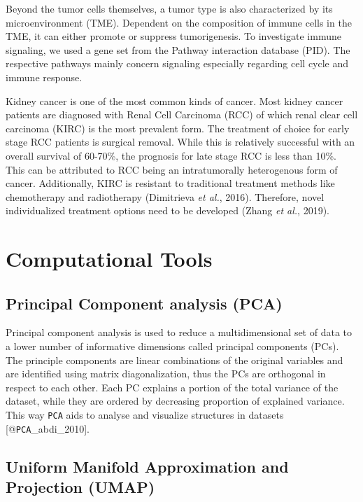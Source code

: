\documentclass[
  parskip,
  oneside]{scrreprt}
\begin{document}
Beyond the tumor cells themselves, a tumor type is also characterized by
its microenvironment (TME). Dependent on the composition of immune cells
in the TME, it can either promote or suppress tumorigenesis. To
investigate immune signaling, we used a gene set from the Pathway
interaction database (PID). The respective pathways mainly concern
signaling especially regarding cell cycle and immune response.

Kidney cancer is one of the most common kinds of cancer. Most kidney
cancer patients are diagnosed with Renal Cell Carcinoma (RCC) of which
renal clear cell carcinoma (KIRC) is the most prevalent form. The
treatment of choice for early stage RCC patients is surgical removal.
While this is relatively successful with an overall survival of 60-70\%,
the prognosis for late stage RCC is less than 10\%. This can be
attributed to RCC being an intratumorally heterogenous form of cancer.
Additionally, KIRC is resistant to traditional treatment methods like
chemotherapy and radiotherapy (Dimitrieva \emph{et al.}, 2016).
Therefore, novel individualized treatment options need to be developed
(Zhang \emph{et al.}, 2019).

\hypertarget{computational-tools}{%
\section{Computational Tools}\label{computational-tools}}

\hypertarget{principal-component-analysis-pca}{%
\subsection{Principal Component analysis
(PCA)}\label{principal-component-analysis-pca}}

Principal component analysis is used to reduce a multidimensional set of
data to a lower number of informative dimensions called principal
components (PCs). The principle components are linear combinations of
the original variables and are identified using matrix diagonalization,
thus the PCs are orthogonal in respect to each other. Each PC explains a
portion of the total variance of the dataset, while they are ordered by
decreasing proportion of explained variance. This way \texttt{PCA} aids
to analyse and visualize structures in datasets
{[}@\texttt{PCA}\_abdi\_2010{]}.

\hypertarget{uniform-manifold-approximation-and-projection-umap}{%
\subsection{Uniform Manifold Approximation and Projection
(UMAP)}\label{uniform-manifold-approximation-and-projection-umap}}
\end{document}
